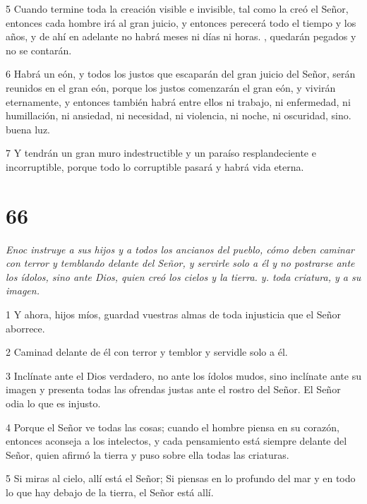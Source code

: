 \par 5 Cuando termine toda la creación visible e invisible, tal como la creó el Señor, entonces cada hombre irá al gran juicio, y entonces perecerá todo el tiempo y los años, y de ahí en adelante no habrá meses ni días ni horas. , quedarán pegados y no se contarán.

\par 6 Habrá un eón, y todos los justos que escaparán del gran juicio del Señor, serán reunidos en el gran eón, porque los justos comenzarán el gran eón, y vivirán eternamente, y entonces también habrá entre ellos ni trabajo, ni enfermedad, ni humillación, ni ansiedad, ni necesidad, ni violencia, ni noche, ni oscuridad, sino. buena luz.

\par 7 Y tendrán un gran muro indestructible y un paraíso resplandeciente e incorruptible, porque todo lo corruptible pasará y habrá vida eterna.

\chapter{66}

\par \textit{Enoc instruye a sus hijos y a todos los ancianos del pueblo, cómo deben caminar con terror y temblando delante del Señor, y servirle solo a él y no postrarse ante los ídolos, sino ante Dios, quien creó los cielos y la tierra. y. toda criatura, y a su imagen.}

\par 1 Y ahora, hijos míos, guardad vuestras almas de toda injusticia que el Señor aborrece.

\par 2 Caminad delante de él con terror y temblor y servidle solo a él.

\par 3 Inclínate ante el Dios verdadero, no ante los ídolos mudos, sino inclínate ante su imagen y presenta todas las ofrendas justas ante el rostro del Señor. El Señor odia lo que es injusto.

\par 4 Porque el Señor ve todas las cosas; cuando el hombre piensa en su corazón, entonces aconseja a los intelectos, y cada pensamiento está siempre delante del Señor, quien afirmó la tierra y puso sobre ella todas las criaturas.

\par 5 Si miras al cielo, allí está el Señor; Si piensas en lo profundo del mar y en todo lo que hay debajo de la tierra, el Señor está allí.

